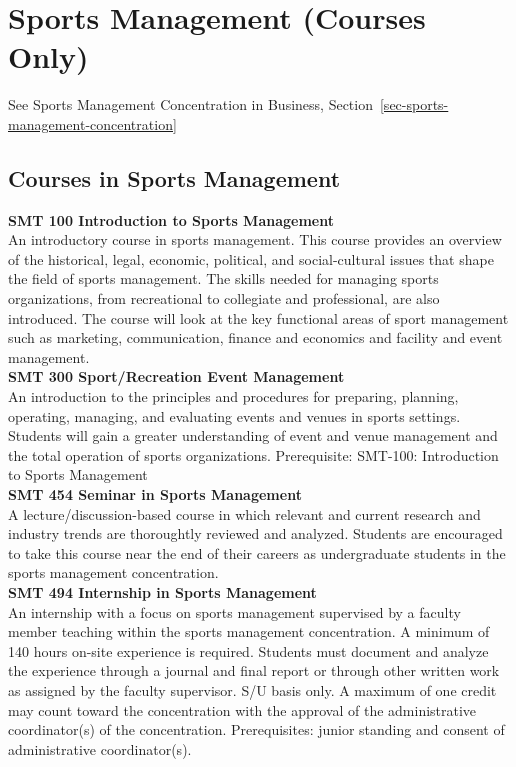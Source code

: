 \documentclass[
  letterpaper,
]{scrbook}
\begin{document}
\section{Sports Management (Courses
Only)}\label{sports-management-courses-only}

See Sports Management Concentration in Business,
Section~\ref{sec-sports-management-concentration}

\subsection{Courses in Sports
Management}\label{courses-in-sports-management}

\textbf{SMT 100 Introduction to Sports Management}\\
An introductory course in sports management. This course provides an
overview of the historical, legal, economic, political, and
social-cultural issues that shape the field of sports management. The
skills needed for managing sports organizations, from recreational to
collegiate and professional, are also introduced. The course will look
at the key functional areas of sport management such as marketing,
communication, finance and economics and facility and event
management.\\
\textbf{SMT 300 Sport/Recreation Event Management}\\
An introduction to the principles and procedures for preparing,
planning, operating, managing, and evaluating events and venues in
sports settings. Students will gain a greater understanding of event and
venue management and the total operation of sports organizations.
Prerequisite: SMT-100: Introduction to Sports Management\\
\textbf{SMT 454 Seminar in Sports Management}\\
A lecture/discussion-based course in which relevant and current research
and industry trends are thoroughtly reviewed and analyzed. Students are
encouraged to take this course near the end of their careers as
undergraduate students in the sports management concentration.\\
\textbf{SMT 494 Internship in Sports Management}\\
An internship with a focus on sports management supervised by a faculty
member teaching within the sports management concentration. A minimum of
140 hours on-site experience is required. Students must document and
analyze the experience through a journal and final report or through
other written work as assigned by the faculty supervisor. S/U basis
only. A maximum of one credit may count toward the concentration with
the approval of the administrative coordinator(s) of the concentration.
Prerequisites: junior standing and consent of administrative
coordinator(s).
\end{document}
